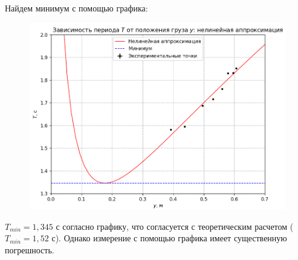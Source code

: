 \documentclass[a4paper,12pt]{article}
\begin{document}
Найдем минимум с помощью графика:
\begin{figure}[H]
\begin{center}
\includegraphics[width=1\textwidth]{T(a)+min}
\end{center}
\end{figure}

$T_{min} = 1,345 $ с согласно графику, что согласуется с теоретическим расчетом ($T_{min} = 1,52$ с). Однако измерение с помощью графика имеет существенную погрешность.
\end{document}

